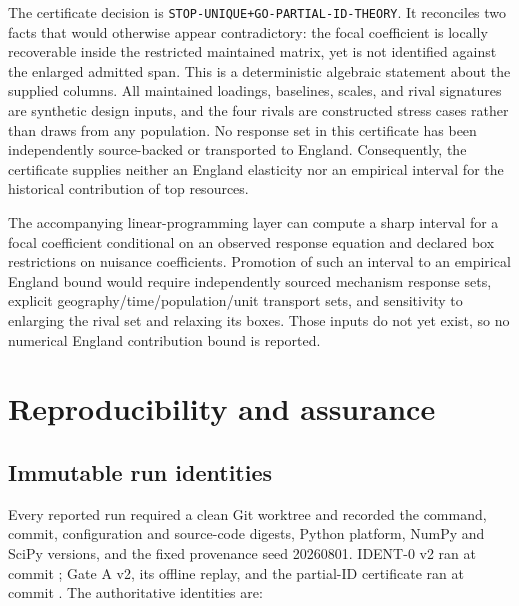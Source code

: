 The certificate decision is
\texttt{STOP-UNIQUE+GO-PARTIAL-ID-THEORY}.  It reconciles two facts that would
otherwise appear contradictory: the focal coefficient is locally recoverable
inside the restricted maintained matrix, yet is not identified against the
enlarged admitted span.  This is a deterministic algebraic statement about
the supplied columns.  All maintained loadings, baselines, scales, and rival
signatures are synthetic design inputs, and the four rivals are constructed
stress cases rather than draws from any population.  No response set in this
certificate has been independently source-backed or transported to England.
Consequently, the certificate supplies neither an England elasticity nor an
empirical interval for the historical contribution of top resources.

The accompanying linear-programming layer can compute a sharp interval for a
focal coefficient conditional on an observed response equation and declared
box restrictions on nuisance coefficients.  Promotion of such an interval to
an empirical England bound would require independently sourced mechanism
response sets, explicit geography/time/population/unit transport sets, and
sensitivity to enlarging the rival set and relaxing its boxes.  Those inputs
do not yet exist, so no numerical England contribution bound is reported.

\clearpage

\section{Reproducibility and assurance}
\label{sec:reproducibility}

\subsection{Immutable run identities}

Every reported run required a clean Git worktree and recorded the command,
commit, configuration and source-code digests, Python platform, NumPy and SciPy
versions, and the fixed provenance seed 20260801.  IDENT-0 v2 ran at commit
; Gate A v2, its offline
replay, and the partial-ID certificate ran at commit
.  The authoritative identities
are:

